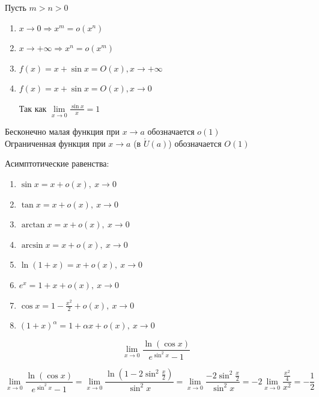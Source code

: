 \begin{example}{}{}
    Пусть \( m > n > 0 \)
    \begin{enumerate}
        \item
            \( x \to 0 \Rightarrow x^m = o(x^n) \)
        \item
            \( x \to +\infty \Rightarrow x^n = o(x^m) \)
        \item
            \( f(x) = x + \sin x = O(x), x \to +\infty \)
        \item
            \( f(x) = x + \sin x = O(x), x \to 0 \)

            Так как \( \lim\limits_{x \to 0} \frac{\sin x}{x} = 1 \)
    \end{enumerate}
\end{example}

\begin{defn}{}{}
    Бесконечно малая функция при \( x \to a \) обозначается \( o(1) \)
    \\
    Ограниченная функция при \( x \to a \) (в \( \mathring{U}(a) \)) обозначается \( O(1) \)
\end{defn}

\newpage

Асимптотические равенства:
\begin{enumerate}
    \item
        \( \sin x = x + o(x), \ x \to 0 \)
    \item
        \( \tan x = x + o(x), \ x \to 0 \)
    \item
        \( \arctan x = x + o(x), \ x \to 0 \)
    \item
        \( \arcsin x = x + o(x), \ x \to 0 \)
    \item
        \( \ln (1 + x) = x + o(x), \ x \to 0 \)
    \item
        \( e^x = 1 + x + o(x), \ x \to 0 \)
    \item
        \( \cos x = 1 - \frac{x^2}{2} + o(x), \ x \to 0 \)
    \item 
        \( (1 + x)^\alpha = 1 + \alpha x + o(x), \ x \to 0 \)
\end{enumerate}

\begin{example}{}{}
    \[
        \lim\limits_{x \to 0} \frac{\ln ( \cos x ) }{e^{\sin^2 x} - 1}
    \]
\end{example}
\[
    \lim\limits_{x \to 0} \frac{\ln ( \cos x ) }{e^{\sin^2 x} - 1}
    =
    \lim\limits_{x \to 0} \frac{\ln ( 1 - 2 \sin^2 \frac{x}{2} ) }{\sin^2 x}
    =
    \lim\limits_{x \to 0} \frac{-2 \sin^2 \frac{x}{2}}{\sin^2 x}
    =
    -2 \lim\limits_{x \to 0} \frac{\frac{x^2}{4}}{x^2}
    =
    -\frac{1}{2}
\]


